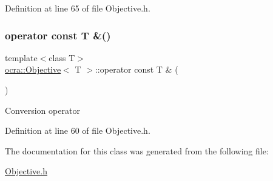 Definition at line 65 of file Objective.\+h.

\hypertarget{classocra_1_1Objective_adde3288cc5ad20394a3558c9b8092b71}{}\label{classocra_1_1Objective_adde3288cc5ad20394a3558c9b8092b71} 
\subsubsection{\texorpdfstring{operator const T \&()}{operator const T \&()}}
{\footnotesize\ttfamily template$<$class T$>$ \\
\hyperlink{classocra_1_1Objective}{ocra\+::\+Objective}$<$ T $>$\+::operator const T \& (\begin{DoxyParamCaption}{ }\end{DoxyParamCaption})\hspace{0.3cm}{\ttfamily [inline]}}

Conversion operator 

Definition at line 60 of file Objective.\+h.



The documentation for this class was generated from the following file\+:\begin{DoxyCompactItemize}
\item 
\hyperlink{Objective_8h}{Objective.\+h}\end{DoxyCompactItemize}
